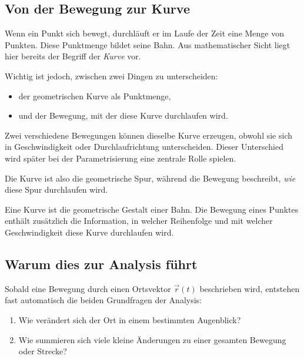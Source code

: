 \newpage
\noindent



\subsection*{Von der Bewegung zur Kurve}
Wenn ein Punkt sich bewegt,
durchläuft er im Laufe der Zeit eine Menge von Punkten.
Diese Punktmenge bildet seine Bahn.
Aus mathematischer Sicht liegt hier bereits der Begriff der \emph{Kurve} vor.

Wichtig ist jedoch,
zwischen zwei Dingen zu unterscheiden:

\begin{itemize}
	\item der geometrischen Kurve als Punktmenge,
	\item und der Bewegung, mit der diese Kurve durchlaufen wird.
\end{itemize}

Zwei verschiedene Bewegungen können dieselbe Kurve erzeugen,
obwohl sie sich in Geschwindigkeit oder Durchlaufrichtung unterscheiden.
Dieser Unterschied wird später bei der Parametrisierung eine zentrale Rolle spielen.

Die Kurve ist also die geometrische Spur,
während die Bewegung beschreibt,
\emph{wie} diese Spur durchlaufen wird.

\begin{DidacticBox}
	Eine Kurve ist die geometrische Gestalt einer Bahn.
	Die Bewegung eines Punktes enthält zusätzlich die Information,
	in welcher Reihenfolge und mit welcher Geschwindigkeit diese Kurve durchlaufen wird.
\end{DidacticBox}



\subsection*{Warum dies zur Analysis führt}
Sobald eine Bewegung durch einen Ortsvektor \(\vec{r}(t)\) beschrieben wird,
entstehen fast automatisch die beiden Grundfragen der Analysis:

\begin{enumerate}
	\item Wie verändert sich der Ort in einem bestimmten Augenblick?
	\item Wie summieren sich viele kleine Änderungen zu einer gesamten Bewegung oder Strecke?
\end{enumerate}

